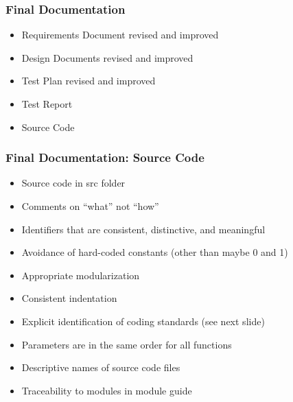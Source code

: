 \documentclass[t,12pt,numbers,fleqn]{beamer}
\begin{document}

\begin{frame}
\frametitle{Final Documentation}
\begin{itemize}
\item Requirements Document revised and improved
\item Design Documents revised and improved
\item Test Plan revised and improved
\item Test Report
\item Source Code
\end{itemize}
\end{frame}


\begin{frame}
\frametitle{Final Documentation: Source Code}
\begin{itemize}
\item Source code in src folder
\item Comments on ``what'' not ``how''
\item Identifiers that are consistent, distinctive, and meaningful
\item Avoidance of hard-coded constants (other than maybe 0 and 1)
\item Appropriate modularization
\item Consistent indentation
\item Explicit identification of coding standards (see next slide)
\item Parameters are in the same order for all functions
\item Descriptive names of source code files
\item Traceability to modules in module guide
\end{itemize}
\end{frame}

\end{document}
